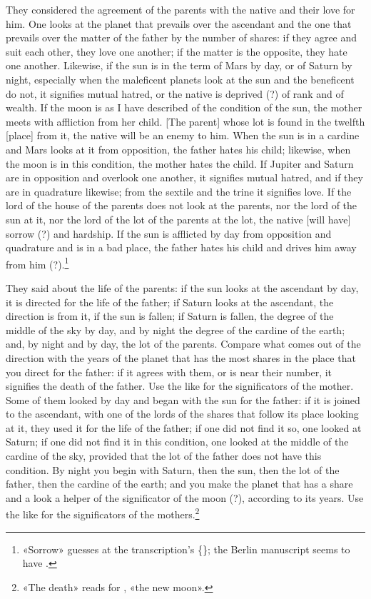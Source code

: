 \documentclass[11pt]{article}
\newcommand{\Fol}[1]{\marginpar{\footnotesize\color{gray}f.\,#1}}
\begin{document}
\par They considered the agreement of the parents with the native and their love for him. One looks at the planet that prevails over the ascendant and the one that prevails over the matter of the father by the number of shares: if they agree and suit each other, they love one another; if the matter is the opposite, they hate one another. Likewise, if the sun is in the term of Mars by day, or of Saturn by night, especially when the maleficent planets look at the sun and the beneficent do not, it signifies mutual hatred, or the native is deprived (?) of rank and of wealth. If the moon is as I have described of the condition of the sun, the mother meets with affliction from her child. [The parent] whose lot is found in the twelfth [place] from it, the native will be an enemy to him. When the sun is in a cardine and Mars looks at it from opposition, the father hates his child; likewise, when the moon is in this condition, the mother hates the child. If Jupiter and Saturn are in opposition and overlook one another, it signifies mutual hatred, and if they are in quadrature likewise; from the sextile and the trine it signifies love. If the lord of the house of the parents does not look at the parents, nor the lord of the sun at it, nor the lord of the lot of the parents at the lot, the native [will have] sorrow (?) and hardship. If the sun is afflicted by day from opposition and quadrature and is in a bad place, the father hates his child and drives him away from him (?).\footnote{«Sorrow» guesses at the transcription's \{\}; the Berlin manuscript seems to have .}\par
\par \Fol{39v}They said about the life of the parents: if the sun looks at the ascendant by day, it is directed for the life of the father; if Saturn looks at the ascendant, the direction is from it, if the sun is fallen; if Saturn is fallen, the degree of the middle of the sky by day, and by night the degree of the cardine of the earth; and, by night and by day, the lot of the parents. Compare what comes out of the direction with the years of the planet that has the most shares in the place that you direct for the father: if it agrees with them, or is near their number, it signifies the death of the father. Use the like for the significators of the mother. Some of them looked by day and began with the sun for the father: if it is joined to the ascendant, with one of the lords of the shares that follow its place looking at it, they used it for the life of the father; if one did not find it so, one looked at Saturn; if one did not find it in this condition, one looked at the middle of the cardine of the sky, provided that the lot of the father does not have this condition. By night you begin with Saturn, then the sun, then the lot of the father, then the cardine of the earth; and you make the planet that has a share and a look a helper of the significator of the moon (?), according to its years. Use the like for the significators of the mothers.\footnote{«The death» reads  for , «the new moon».}\par
\end{document}
